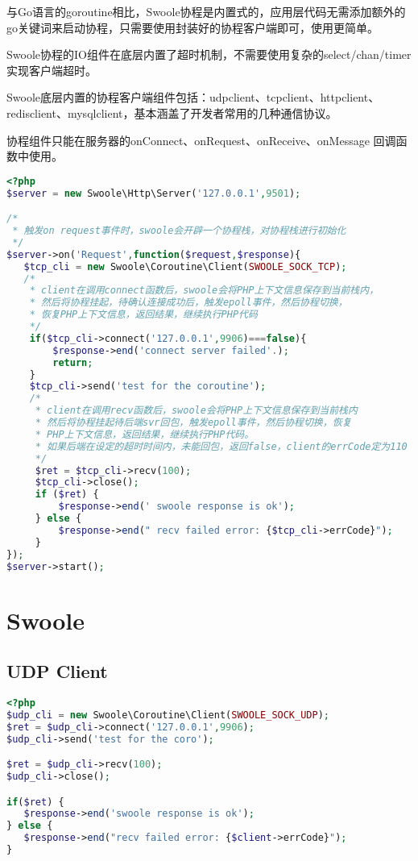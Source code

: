 与Go语言的goroutine相比，Swoole协程是内置式的，应用层代码无需添加额外的go关键词来启动协程，只需要使用封装好的协程客户端即可，使用更简单。



Swoole协程的IO组件在底层内置了超时机制，不需要使用复杂的select/chan/timer实现客户端超时。

Swoole底层内置的协程客户端组件包括：udpclient、tcpclient、httpclient、redisclient、mysqlclient，基本涵盖了开发者常用的几种通信协议。

协程组件只能在服务器的onConnect、onRequest、onReceive、onMessage 回调函数中使用。

\begin{lstlisting}[language=PHP]
<?php
$server = new Swoole\Http\Server('127.0.0.1',9501);

/*
 * 触发on request事件时，swoole会开辟一个协程栈，对协程栈进行初始化
 */
$server->on('Request',function($request,$response){
   $tcp_cli = new Swoole\Coroutine\Client(SWOOLE_SOCK_TCP);
   /*
    * client在调用connect函数后，swoole会将PHP上下文信息保存到当前栈内，
    * 然后将协程挂起，待确认连接成功后，触发epoll事件，然后协程切换，
    * 恢复PHP上下文信息，返回结果，继续执行PHP代码
    */
    if($tcp_cli->connect('127.0.0.1',9906)===false){
        $response->end('connect server failed'.);
        return;
    }
    $tcp_cli->send('test for the coroutine');
    /*
     * client在调用recv函数后，swoole会将PHP上下文信息保存到当前栈内
     * 然后将协程挂起待后端svr回包，触发epoll事件，然后协程切换，恢复
     * PHP上下文信息，返回结果，继续执行PHP代码。
     * 如果后端在设定的超时时间内，未能回包，返回false，client的errCode定为110
     */
     $ret = $tcp_cli->recv(100);
     $tcp_cli->close();
     if ($ret) {
         $response->end(' swoole response is ok');
     } else {
         $response->end(" recv failed error: {$tcp_cli->errCode}");
     }
});
$server->start();
\end{lstlisting}


\section{Swoole}


\subsection{UDP Client}


\begin{lstlisting}[language=PHP]
<?php
$udp_cli = new Swoole\Coroutine\Client(SWOOLE_SOCK_UDP);
$ret = $udp_cli->connect('127.0.0.1',9906);
$udp_cli->send('test for the coro');

$ret = $udp_cli->recv(100);
$udp_cli->close();

if($ret) {
   $response->end('swoole response is ok');
} else {
   $response->end("recv failed error: {$client->errCode}");
}
\end{lstlisting}

